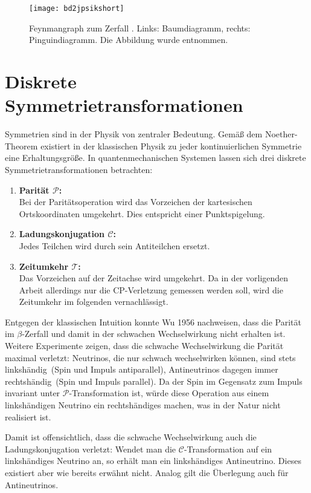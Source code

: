 \begin{figure}[hptb]
\centering
\texttt{[image: bd2jpsikshort]}
\caption{Feynmangraph zum Zerfall \Decaychannel. Links: Baumdiagramm, rechts: Pinguindiagramm. Die Abbildung wurde \cite{lhcb-paper} entnommen.}
\label{fig:decay}
\end{figure}

\section{Diskrete Symmetrietransformationen}
Symmetrien sind in der Physik von zentraler Bedeutung. Gemäß dem Noether-Theorem existiert in der klassischen Physik zu jeder kontinuierlichen Symmetrie eine Erhaltungsgröße. In quantenmechanischen Systemen lassen sich drei diskrete Symmetrietransformationen betrachten:
\begin{enumerate}
\item \textbf{Parität $\mathcal{P}$:} \\
      Bei der Paritätsoperation wird das Vorzeichen der kartesischen Ortskoordinaten umgekehrt. Dies entspricht einer Punktspigelung.
\item \textbf{Ladungskonjugation $\mathcal{C}$:} \\
      Jedes Teilchen wird durch sein Antiteilchen ersetzt.
\item \textbf{Zeitumkehr $\mathcal{T}$:} \\
      Das Vorzeichen auf der Zeitachse wird umgekehrt. Da in der vorligenden Arbeit allerdings nur die CP-Verletzung gemessen werden soll, wird die Zeitumkehr im folgenden vernachlässigt.
\end{enumerate}
Entgegen der klassischen Intuition konnte Wu 1956 nachweisen, dass die Parität im $\beta$-Zerfall und damit in der schwachen Wechselwirkung nicht erhalten ist. Weitere Experimente zeigen, dass die schwache Wechselwirkung die Parität maximal verletzt: Neutrinos, die nur schwach wechselwirken können, sind stets \glqq linkshändig\grqq\ (Spin und Impuls antiparallel), Antineutrinos dagegen immer \glqq rechtshändig\grqq\ (Spin und Impuls parallel). Da der Spin im Gegensatz zum Impuls invariant unter $\mathcal{P}$-Transformation ist, würde diese Operation aus einem linkshändigen Neutrino ein rechtshändiges machen, was in der Natur nicht realisiert ist.

Damit ist offensichtlich, dass die schwache Wechselwirkung auch die Ladungskonjugation verletzt: Wendet man die $\mathcal{C}$-Transformation auf ein linkshändiges Neutrino an, so erhält man ein linkshändiges Antineutrino. Dieses existiert aber wie bereits erwähnt nicht. Analog gilt die Überlegung auch für Antineutrinos.

